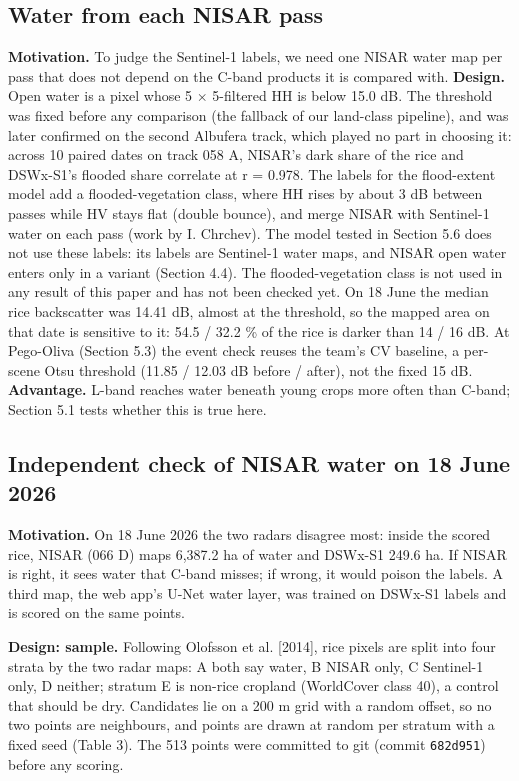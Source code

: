 \documentclass[10pt,twocolumn]{article}
\begin{document}
\subsection{Water from each NISAR pass}
\textbf{Motivation.} To judge the Sentinel-1 labels, we need one NISAR water map per pass that does not depend on the C-band products it is compared with. \textbf{Design.} Open water is a pixel whose 5 $\times$ 5-filtered HH is below \textminus{}15.0 dB. The threshold was fixed before any comparison (the fallback of our land-class pipeline), and was later confirmed on the second Albufera track, which played no part in choosing it: across 10 paired dates on track 058 A, NISAR's dark share of the rice and DSWx-S1's flooded share correlate at r = 0.978. The labels for the flood-extent model add a flooded-vegetation class, where HH rises by about 3 dB between passes while HV stays flat (double bounce), and merge NISAR with Sentinel-1 water on each pass (work by I. Chrchev). The model tested in Section 5.6 does not use these labels: its labels are Sentinel-1 water maps, and NISAR open water enters only in a variant (Section 4.4). The flooded-vegetation class is not used in any result of this paper and has not been checked yet. On 18 June the median rice backscatter was \textminus{}14.41 dB, almost at the threshold, so the mapped area on that date is sensitive to it: 54.5 / 32.2 \% of the rice is darker than \textminus{}14 / \textminus{}16 dB. At Pego-Oliva (Section 5.3) the event check reuses the team's CV baseline, a per-scene Otsu threshold (\textminus{}11.85 / \textminus{}12.03 dB before / after), not the fixed \textminus{}15 dB. \textbf{Advantage.} L-band reaches water beneath young crops more often than C-band; Section 5.1 tests whether this is true here.

\subsection{Independent check of NISAR water on 18 June 2026}
\textbf{Motivation.} On 18 June 2026 the two radars disagree most: inside the scored rice, NISAR (066 D) maps 6,387.2 ha of water and DSWx-S1 249.6 ha. If NISAR is right, it sees water that C-band misses; if wrong, it would poison the labels. A third map, the web app's U-Net water layer, was trained on DSWx-S1 labels and is scored on the same points.

\textbf{Design: sample.} Following Olofsson et al. [2014], rice pixels are split into four strata by the two radar maps: A both say water, B NISAR only, C Sentinel-1 only, D neither; stratum E is non-rice cropland (WorldCover class 40), a control that should be dry. Candidates lie on a 200 m grid with a random offset, so no two points are neighbours, and points are drawn at random per stratum with a fixed seed (Table 3). The 513 points were committed to git (commit \texttt{682d951}) before any scoring.
\end{document}
